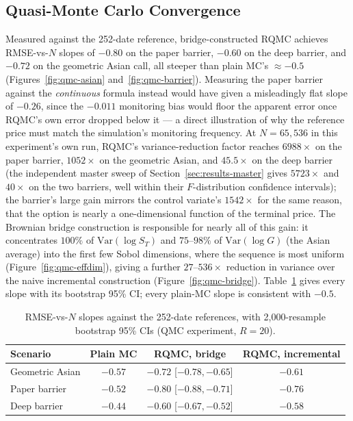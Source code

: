 \documentclass[sigconf]{acmart}
\begin{document}
\subsection{Quasi-Monte Carlo Convergence}
\label{sec:results-qmc}
Measured against the 252-date reference, bridge-constructed RQMC achieves
RMSE-vs-$N$ slopes of $-0.80$ on the paper barrier, $-0.60$ on the deep
barrier, and $-0.72$ on the geometric Asian call, all steeper than plain
MC's $\approx -0.5$ (Figures~\ref{fig:qmc-asian} and~\ref{fig:qmc-barrier}). Measuring the paper
barrier against the \emph{continuous} formula instead would have given a
misleadingly flat slope of $-0.26$, since the $-0.011$ monitoring bias would
floor the apparent error once RQMC's own error dropped below it --- a direct
illustration of why the reference price must match the simulation's
monitoring frequency. At $N=65{,}536$ in this experiment's own run, RQMC's
variance-reduction factor reaches $6988\times$ on the paper barrier,
$1052\times$ on the geometric Asian, and $45.5\times$ on the deep barrier
(the independent master sweep of Section~\ref{sec:results-master} gives
$5723\times$ and $40\times$ on the two barriers, well within their
$F$-distribution confidence intervals); the barrier's large gain mirrors
the control variate's $1542\times$ for the same reason, that the option is
nearly a one-dimensional function of the terminal price. The Brownian bridge
construction is responsible for nearly all of this gain: it concentrates
$100\%$ of $\mathrm{Var}(\log S_T)$ and $75$--$98\%$ of
$\mathrm{Var}(\log G)$ (the Asian average) into the first few Sobol
dimensions, where the sequence is most uniform
(Figure~\ref{fig:qmc-effdim}), giving a further $27$--$536\times$ reduction
in variance over the naive incremental construction
(Figure~\ref{fig:qmc-bridge}). Table~\ref{tab:qmc-slopes} gives every slope
with its bootstrap 95\% CI; every plain-MC slope is consistent with $-0.5$.

\begin{table}[t]
\caption{RMSE-vs-$N$ slopes against the 252-date references, with 2{,}000-resample
bootstrap 95\% CIs (QMC experiment, $R=20$).}
\label{tab:qmc-slopes}
\small
\begin{tabular}{lccc}
\toprule
\textbf{Scenario} & \textbf{Plain MC} & \textbf{RQMC, bridge} & \textbf{RQMC, incremental} \\
\midrule
Geometric Asian & $-0.57$ & $\mathbf{-0.72}$ {\scriptsize[$-0.78,-0.65$]} & $-0.61$ \\
Paper barrier & $-0.52$ & $\mathbf{-0.80}$ {\scriptsize[$-0.88,-0.71$]} & $-0.76$ \\
Deep barrier & $-0.44$ & $\mathbf{-0.60}$ {\scriptsize[$-0.67,-0.52$]} & $-0.58$ \\
\bottomrule
\end{tabular}
\end{table}
\end{document}
